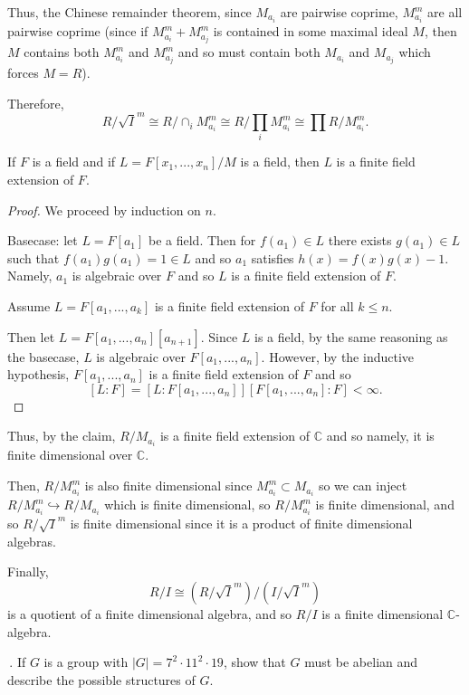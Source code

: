 \documentclass[12pt]{Qual}
\begin{document}
\begin{solution}
Thus, the Chinese remainder theorem, since $M_{a_i}$ are pairwise coprime, $M_{a_i}^m$ are all pairwise coprime (since if $M_{a_i}^m+M_{a_j}^m$ is contained in some maximal ideal $M$, then $M$ contains both $M_{a_i}^m$ and $M_{a_j}^m$ and so must contain both $M_{a_i}$ and $M_{a_j}$ which forces $M=R$).

Therefore, $$R/\sqrt{I}^m\cong R/\cap_iM_{a_i}^m\cong R/\prod_iM_{a_i}^m\cong \prod R/M_{a_i}^m.$$

\begin{claim} If $F$ is a field and if $L=F[x_1,...,x_n]/M$ is a field, then $L$ is a finite field extension of $F$.
\begin{proof} We proceed by induction on $n.$

Basecase: let $L=F[a_1]$ be a field. Then for $f(a_1)\in L$ there exists $g(a_1)\in L$ such that $f(a_1)g(a_1)=1\in L$ and so $a_1$ satisfies $h(x)=f(x)g(x)-1$. Namely, $a_1$ is algebraic over $F$ and so $L$ is a finite field extension of $F.$

Assume $L=F[a_1,...,a_k]$ is a finite field extension of $F$ for all $k\le n$.

Then let $L=F[a_1,...,a_n][a_{n+1}]$. Since $L$ is a field, by the same reasoning as the basecase, $L$ is algebraic over $F[a_1,...,a_n]$. However, by the inductive hypothesis, $F[a_1,...,a_n]$ is a finite field extension of $F$ and so $$[L:F]=[L:F[a_1,...,a_n]][F[a_1,...,a_n]:F]<\infty.$$
\end{proof}
\end{claim}

Thus, by the claim, $R/M_{a_i}$ is a finite field extension of $\mathbb{C}$ and so namely, it is finite dimensional over $\mathbb{C}$.

Then, $R/M_{a_i}^m$ is also finite dimensional since $M_{a_i}^m\subset M_{a_i}$ so we can inject $R/M_{a_i}^m\hookrightarrow R/M_{a_i}$ which is finite dimensional, so $R/M_{a_i}^m$ is finite dimensional, and so $R/\sqrt{I}^m$ is finite dimensional since it is a product of finite dimensional algebras.

Finally, $$R/I\cong (R/\sqrt{I}^m)/(I/\sqrt{I}^m)$$ is a quotient of a finite dimensional algebra, and so $R/I$ is a finite dimensional $\mathbb{C}$-algebra.
\end{solution}
\newpage


\begin{problem} $\,$.
If $G$ is a group with $|G|=7^2\cdot 11^2\cdot 19$, show that $G$ must be abelian and describe the possible structures of $G.$
\end{problem}
\end{document}
